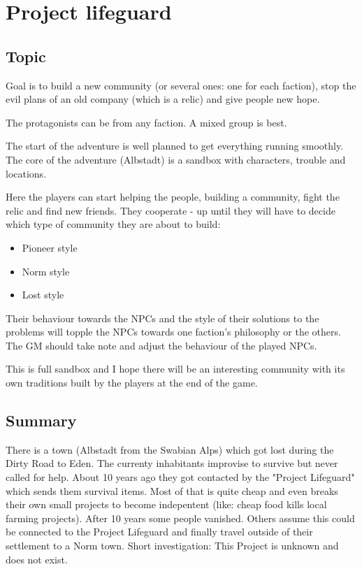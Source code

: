 \chapter{Project lifeguard}
\label{ch:project lifeguard}

\section{Topic}

Goal is to build a new community (or several ones: one for each faction), stop the evil plans of an old company (which is a relic) and give people new hope.

The protagonists can be from any faction. A mixed group is best.

The start of the adventure is well planned to get everything running smoothly. The core of the adventure (Albstadt) is a sandbox with characters, trouble and locations.

Here the players can start helping the people, building a community, fight the relic and find new friends. They cooperate - up until they will have to decide which type of community they are about to build:

\begin{itemize}
    \item Pioneer style
    \item Norm style
    \item Lost style
\end{itemize}

Their behaviour towards the NPCs and the style of their solutions to the problems will topple the NPCs towards one faction's philosophy or the others. The GM should take note and adjust the behaviour of the played NPCs.

This is full sandbox and I hope there will be an interesting community with its own traditions built by the players at the end of the game.

\section{Summary}

There is a town (Albstadt from the Swabian Alps) which got lost during the Dirty Road to Eden. The currenty inhabitants improvise to survive but never called for help. About 10 years ago they got contacted by the "Project Lifeguard" which sends them survival items. Most of that is quite cheap and even breaks their own small projects to become indepentent (like: cheap food kills local farming projects). After 10 years some people vanished. Others assume this could be connected to the Project Lifeguard and finally travel outside of their settlement to a Norm town. Short investigation: This Project is unknown and does not exist.

